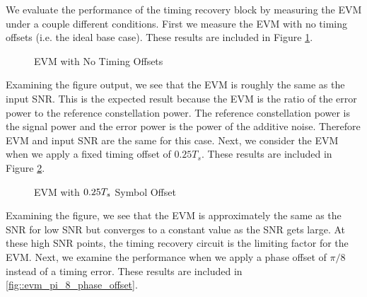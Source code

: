 \documentclass{article}
\begin{document}
We evaluate the performance of the timing recovery block by measuring the EVM under a couple different conditions. First we measure the EVM with no timing offsets (i.e. the ideal base case). These results are included in Figure \ref{fig::evm_no_timing_offset}.

\begin{figure}[H]
	\centerline{}
	\caption{EVM with No Timing Offsets}
	\label{fig::evm_no_timing_offset}
\end{figure}

Examining the figure output, we see that the EVM is roughly the same as the input SNR. This is the expected result because the EVM is the ratio of the error power to the reference constellation power. The reference constellation power is the signal power and the error power is the power of the additive noise. Therefore EVM and input SNR are the same for this case. Next, we consider the EVM when we apply a fixed timing offset of $0.25T_s$. These results are included in Figure \ref{fig::evm_0p25_symbol_offset}.

\begin{figure}[H]
	\centerline{}
	\caption{EVM with $\protect{0.25T_s}$ Symbol Offset}
	\label{fig::evm_0p25_symbol_offset}
\end{figure}

Examining the figure, we see that the EVM is approximately the same as the SNR for low SNR but converges to a constant value as the SNR gets large. At these high SNR points, the timing recovery circuit is the limiting factor for the EVM. Next, we examine the performance when we apply a phase offset of $\pi/8$ instead of a timing error. These results are included in \ref{fig::evm_pi_8_phase_offset}.
\end{document}
